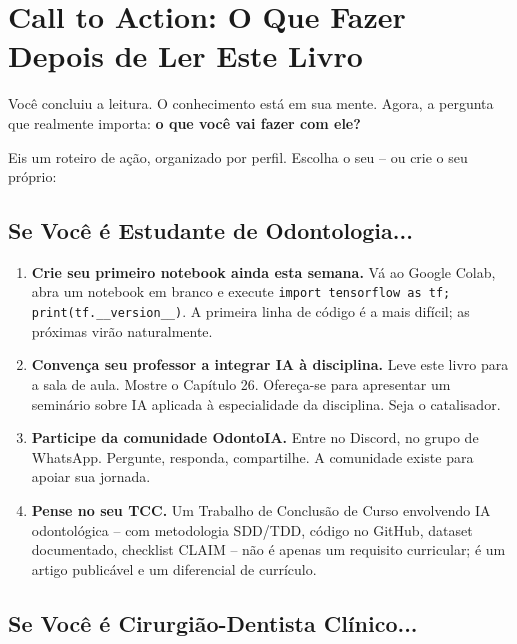 \section{Call to Action: O Que Fazer Depois de Ler Este Livro}
\label{sec:call-to-action}

\niveldois

Você concluiu a leitura. O conhecimento está em sua mente. Agora, a pergunta
que realmente importa: \textbf{o que você vai fazer com ele?}

Eis um roteiro de ação, organizado por perfil. Escolha o seu -- ou crie o seu
próprio:

\subsection{Se Você é Estudante de Odontologia...}

\begin{enumerate}
  \item \textbf{Crie seu primeiro notebook ainda esta semana.} Vá ao Google
    Colab, abra um notebook em branco e execute \texttt{import tensorflow as tf;
    print(tf.\_\_version\_\_)}. A primeira linha de código é a mais difícil; as
    próximas virão naturalmente.

  \item \textbf{Convença seu professor a integrar IA à disciplina.} Leve este
    livro para a sala de aula. Mostre o Capítulo 26. Ofereça-se para apresentar
    um seminário sobre IA aplicada à especialidade da disciplina. Seja o
    catalisador.

  \item \textbf{Participe da comunidade OdontoIA.} Entre no Discord, no grupo
    de WhatsApp. Pergunte, responda, compartilhe. A comunidade existe para
    apoiar sua jornada.

  \item \textbf{Pense no seu TCC.} Um Trabalho de Conclusão de Curso envolvendo
    IA odontológica -- com metodologia SDD/TDD, código no GitHub, dataset
    documentado, checklist CLAIM -- não é apenas um requisito curricular; é um
    artigo publicável e um diferencial de currículo.
\end{enumerate}

\subsection{Se Você é Cirurgião-Dentista Clínico...}


